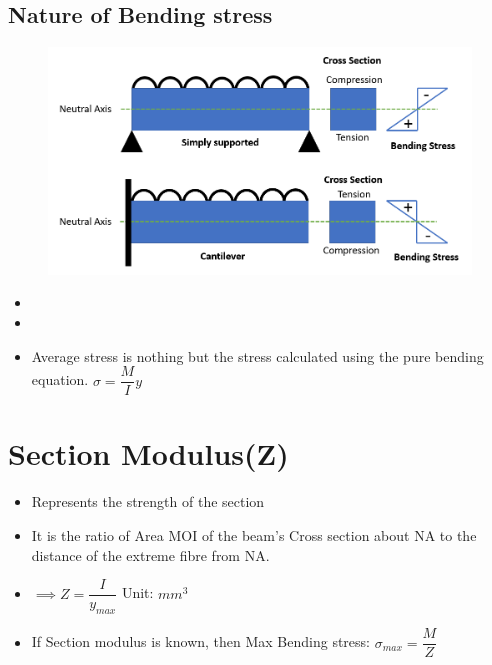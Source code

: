 \documentclass[8pt]{report}
\begin{document}
	\subsection{Nature of Bending stress}
		\begin{figure}[H]
			\centering
			\includegraphics[scale=0.5]{natureofbending.png}
		\end{figure}
		\begin{itemize}
			\item {}
			\item {}
			\item Average stress is nothing but the stress calculated using the pure bending equation. $\boxed{\sigma = \dfrac{M}{I}y}$
		\end{itemize}\hrulefill
	\section{Section Modulus(Z)}
		\begin{itemize}
			\item Represents the strength of the section
			\item It is the ratio of Area MOI of the beam's Cross section about NA to the distance of the extreme fibre from NA. 
			\item $\implies \boxed{Z = \dfrac{I}{y_{max}}}$ Unit: $mm^3$
			\item If Section modulus is known, then Max Bending stress: $\boxed{\sigma_{max} = \dfrac{M}{Z}}$
		\end{itemize}\hrulefill
\end{document}
